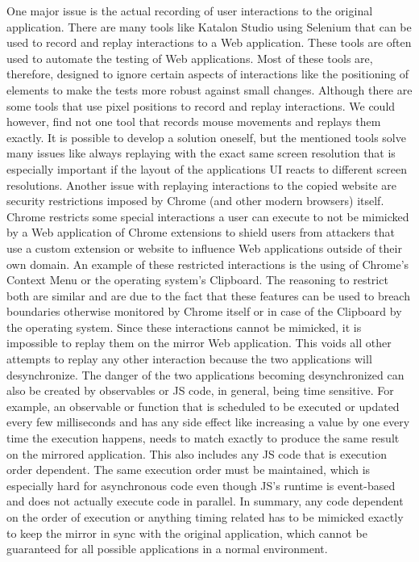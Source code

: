  One major issue is the actual recording of user interactions to the original application. There are many tools like Katalon Studio \cite{Katalon} using Selenium \cite{Selenium} that can be used to record and replay interactions to a Web application. These tools are often used to automate the testing of Web applications. Most of these tools are, therefore, designed to ignore certain aspects of interactions like the positioning of elements to make the tests more robust against small changes. Although there are some tools that use pixel positions to record and replay interactions. We could however, find not one tool that records mouse movements and replays them exactly. It is possible to develop a solution oneself, but the mentioned tools solve many issues like always replaying with the exact same screen resolution that is especially important if the layout of the applications UI reacts to different screen resolutions. Another issue with replaying interactions to the copied website are security restrictions imposed by Chrome (and other modern browsers) itself. Chrome restricts some special interactions a user can execute to not be mimicked by a Web application of Chrome extensions to shield users from attackers that use a custom extension or website to influence Web applications outside of their own domain. An example of these restricted interactions is the using of Chrome's Context Menu or the operating system's Clipboard. The reasoning to restrict both are similar and are due to the fact that these features can be used to breach boundaries otherwise monitored by Chrome itself or in case of the Clipboard by the operating system. Since these interactions cannot be mimicked, it is impossible to replay them on the mirror Web application. This voids all other attempts to replay any other interaction because the two applications will desynchronize. The danger of the two applications becoming desynchronized can also be created by observables or JS code, in general, being time sensitive. For example, an observable or function that is scheduled to be executed or updated every few milliseconds and has any side effect like increasing a value by one every time the execution happens, needs to match exactly to produce the same result on the mirrored application. This also includes any JS code that is execution order dependent. The same execution order must be maintained, which is especially hard for asynchronous code even though JS's runtime is event-based \cite{EventBasedJS} and does not actually execute code in parallel. In summary, any code dependent on the order of execution or anything timing related has to be mimicked exactly to keep the mirror in sync with the original application, which cannot be guaranteed for all possible applications in a normal environment. \\
